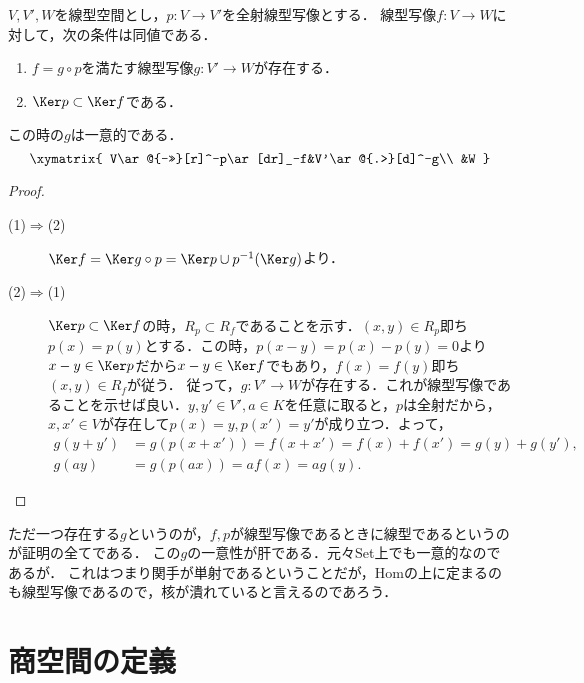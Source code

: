 \documentclass[uplatex, dvipdfmx]{jsreport}
\begin{document}
\begin{corollary}[全射の研究のVectへの持ち上げ]\label{cor-universality-of-quotient-space}
    $V,V',W$を線型空間とし，$p:V\to V'$を全射線型写像とする．
    線型写像$f:V\to W$に対して，次の条件は同値である．
    \begin{enumerate}
        \item $f=g\circ p$を満たす線型写像$g:V'\to W$が存在する．
        \item $\Ker p\subset\Ker f$である．
    \end{enumerate}
    この時の$g$は一意的である．
    \[\xymatrix{
        V\ar@{->>}[r]^-p\ar[dr]_-f&V'\ar@{.>}[d]^-g\\
        &W
    }\]
\end{corollary}
\begin{proof}\mbox{}
    \begin{description}
        \item[(1)$\Rightarrow$(2)] 
        $\Ker f=\Ker g\circ p=\Ker p\cup p^{-1}(\Ker g)$より．
        \item[(2)$\Rightarrow$(1)] 
        $\Ker p\subset\Ker f$の時，$R_p\subset R_f$であることを示す．$(x,y)\in R_p$即ち$p(x)=p(y)$とする．この時，$p(x-y)=p(x)-p(y)=0$より$x-y\in\Ker p$だから$x-y\in\Ker f$でもあり，$f(x)=f(y)$即ち$(x,y)\in R_f$が従う．
        従って，$g:V'\to W$が存在する．これが線型写像であることを示せば良い．$y,y'\in V',a\in K$を任意に取ると，$p$は全射だから，$x,x'\in V$が存在して$p(x)=y,p(x')=y'$が成り立つ．よって，
        \begin{align*}
            g(y+y')&=g(p(x+x'))=f(x+x')=f(x)+f(x')=g(y)+g(y'),\\
            g(ay)&=g(p(ax))=af(x)=ag(y).
        \end{align*}
    \end{description}
\end{proof}
\begin{remarks}
    ただ一つ存在する$g$というのが，$f,p$が線型写像であるときに線型であるというのが証明の全てである．
    この$g$の一意性が肝である．元々Set上でも一意的なのであるが．
    これはつまり関手が単射であるということだが，Homの上に定まるのも線型写像であるので，核が潰れていると言えるのであろう．
\end{remarks}

\section{商空間の定義}
\end{document}
